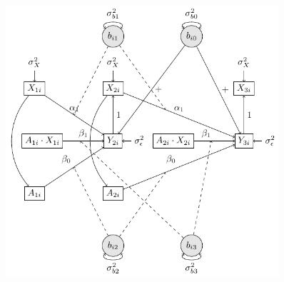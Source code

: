 \documentclass[
  12pt,
  a4paper,
]{article}
\begin{document}
\begin{figure}[H]
\begin{minipage}{0.50\linewidth}
{\includegraphics[width=0.9\textwidth,height=\textheight]{research-report_files/figure-pdf/fig-GM2_path-1.pdf}

}

\end{minipage}%
\newline
\begin{minipage}{0.50\linewidth}


\end{minipage}
\end{figure}
\end{document}
